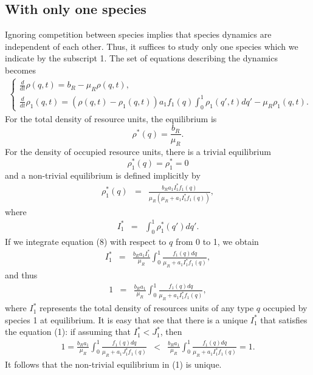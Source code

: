 \documentclass[8pt,a4paper]{article}
\begin{document}
\subsection{With only one species}
Ignoring competition between species implies that species dynamics are independent of each other.
Thus, it suffices to study only one species which we indicate by the subscript 1. The set of equations describing the dynamics becomes
\begin{eqnarray}
\begin{cases}
\frac{\displaystyle{d}}{\displaystyle{dt}}\rho(q,t)= b_R-\mu_R \rho(q,t),\\
\frac{\displaystyle{d}}{\displaystyle{dt}}\rho_1(q,t)= (\rho(q,t)-\rho_1(q,t)) a_1  f_1(q)\displaystyle{\int_0^1} \rho_1(q',t) dq'-\mu_R \rho_1(q,t).
\end{cases}
\end{eqnarray}
For the total density of resource units, the equilibrium is $$\rho^*(q)=\frac{b_R}{\mu_R}.$$
For the density of occupied resource units, there is a trivial equilibrium 
$$\rho_1^*(q)=\rho_1^*=0$$
and a non-trivial equilibrium is  defined implicitly by
\begin{eqnarray}
\rho_1^*(q)&=& \frac{b_R a_1 I_1^*f_1(q)}{\mu_R (\mu_R + a_1 I_1^* f_1(q))},
\end{eqnarray}
where
\begin{eqnarray*}
I_1^* &=& \int_0^1 \rho_1^*(q') dq'.
\end{eqnarray*}
If we integrate equation (8) with respect to $q$ from 0 to 1, we obtain
\begin{eqnarray*}
I_1^* &=& \frac{b_R a_1 I_1^*}{\mu_R}\int_0^1 \frac{f_1(q)dq}{\mu_R+ a_1 I_1^* f_1(q)}, 
\end{eqnarray*} 
and thus
\begin{eqnarray}
1 &=& \frac{b_R a_1}{\mu_R} \int_0^1 \frac{f_1(q)dq}{\mu_R+ a_1 I_1^* f_1(q)},
\end{eqnarray} 
where $I_1^*$ represents the total density of resources units of any type $q$ occupied by species 1 at equilibrium. It is easy that see that there is a unique $I_1^*$ that satisfies the equation (1): if assuming that $I_1^*<J_1^*$, then 
\begin{eqnarray*}
1 = \frac{b_R a_1}{\mu_R} \int_0^1 \frac{f_1(q)dq}{\mu_R+ a_1 J_1^* f_1(q)} & < & \frac{b_R a_1}{\mu_R} \int_0^1 \frac{f_1(q)dq}{\mu_R+ a_1 I_1^* f_1(q)}=1.
\end{eqnarray*}
It follows that the non-trivial equilibrium in (1) is unique.
\end{document}
